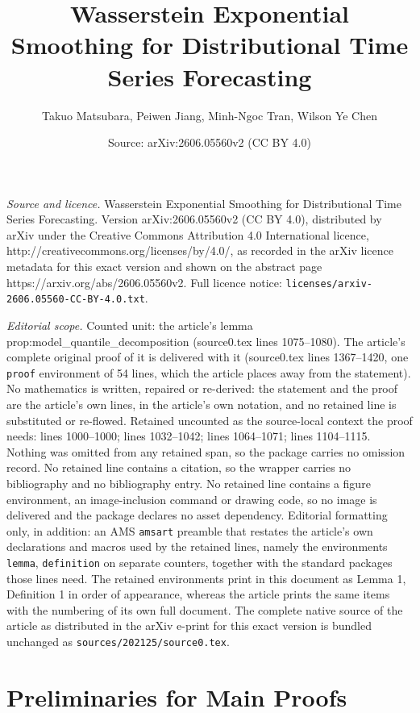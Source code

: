 \documentclass[10pt,a4paper]{amsart}
\title{Wasserstein Exponential Smoothing for Distributional Time Series Forecasting}
\author{Takuo Matsubara, Peiwen Jiang, Minh-Ngoc Tran, Wilson Ye Chen}
\date{Source: arXiv:2606.05560v2 (CC BY 4.0)}
\begin{document}
\maketitle

\noindent\emph{Source and licence.} Wasserstein Exponential Smoothing for Distributional Time Series Forecasting. Version arXiv:2606.05560v2 (CC BY 4.0), distributed by arXiv under the Creative Commons Attribution 4.0 International licence, http://creativecommons.org/licenses/by/4.0/, as recorded in the arXiv licence metadata for this exact version and shown on the abstract page https://arxiv.org/abs/2606.05560v2. Full licence notice: \texttt{licenses/arxiv-2606.05560-CC-BY-4.0.txt}.\par\smallskip

\noindent\textit{Editorial scope.} Counted unit: the article's lemma prop:model\_quantile\_decomposition (source0.tex lines 1075--1080). The article's complete original proof of it is delivered with it (source0.tex lines 1367--1420, one \texttt{proof} environment of 54 lines, which the article places away from the statement). No mathematics is written, repaired or re-derived: the statement and the proof are the article's own lines, in the article's own notation, and no retained line is substituted or re-flowed.  Retained uncounted as the source-local context the proof needs: lines 1000--1000; lines 1032--1042; lines 1064--1071; lines 1104--1115.  Nothing was omitted from any retained span, so the package carries no omission record.  No retained line contains a citation, so the wrapper carries no bibliography and no bibliography entry.  No retained line contains a figure environment, an image-inclusion command or drawing code, so no image is delivered and the package declares no asset dependency.  Editorial formatting only, in addition: an AMS \texttt{amsart} preamble that restates the article's own declarations and macros used by the retained lines, namely the environments \texttt{lemma}, \texttt{definition} on separate counters, together with the standard packages those lines need.  The retained environments print in this document as Lemma 1, Definition 1 in order of appearance, whereas the article prints the same items with the numbering of its own full document.  The complete native source of the article as distributed in the arXiv e-print for this exact version is bundled unchanged as \texttt{sources/202125/source0.tex}.
\section{Preliminaries for Main Proofs} \label{apx:preparation}
\end{document}
